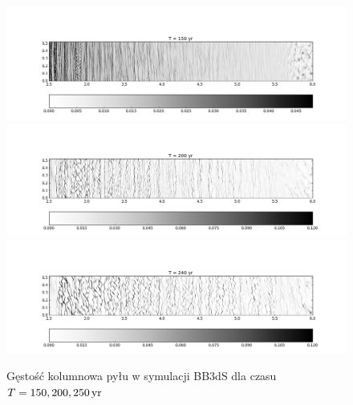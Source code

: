 \begin{figure}
   \centering
   \includegraphics[width=0.95\linewidth]{figures/proj1.png}\\
   \includegraphics[width=0.95\linewidth]{figures/proj2.png}\\
   \includegraphics[width=0.95\linewidth]{figures/proj3.png} \caption{Gęstość
      kolumnowa pyłu w symulacji BB3dS dla czasu $T=150, 200, 250\hbox{$\thinspace\textrm{yr}$}$}
   \label{fig:projs}
\end{figure}
